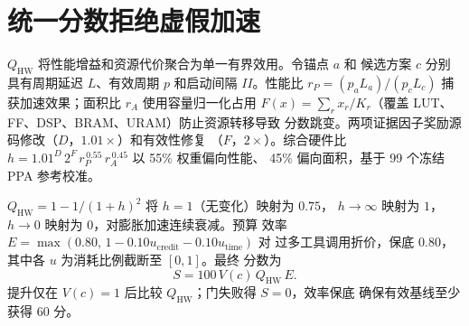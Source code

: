\section{统一分数拒绝虚假加速}

$Q_{\mathrm{HW}}$ 将性能增益和资源代价聚合为单一有界效用。令锚点 $a$ 和
候选方案 $c$ 分别具有周期延迟 $L$、有效周期 $p$ 和启动间隔 $II$。性能比
$r_P = (p_a L_a)/(p_c L_c)$ 捕获加速效果；面积比 $r_A$ 使用容量归一化占用
$F(x)=\sum_{r} x_r/K_r$（覆盖 LUT、FF、DSP、BRAM、URAM）防止资源转移导致
分数跳变。两项证据因子奖励源码修改（$D$，$1.01{\times}$）和有效性修复
（$F$，$2{\times}$）。综合硬件比
$h = 1.01^{D}\,2^{F}\,r_P^{\,0.55}\,r_A^{\,0.45}$ 以 55\% 权重偏向性能、
45\% 偏向面积，基于 99 个冻结 PPA 参考校准。

$Q_{\mathrm{HW}} = 1-1/(1+h)^2$ 将 $h{=}1$（无变化）映射为 $0.75$，
$h{\to}\infty$ 映射为 $1$，$h{\to}0$ 映射为 $0$，对膨胀加速连续衰减。预算
效率 $E = \max(0.80,\,1-0.10u_{\mathrm{credit}}-0.10u_{\mathrm{time}})$ 对
过多工具调用折价，保底 $0.80$，其中各 $u$ 为消耗比例截断至 $[0,1]$。最终
分数为
\begin{equation}
S = 100\,V(c)\,Q_{\mathrm{HW}}\,E.
\label{eq:score}
\end{equation}
提升仅在 $V(c){=}1$ 后比较 $Q_{\mathrm{HW}}$；门失败得 $S{=}0$，效率保底
确保有效基线至少获得 $60$ 分。
